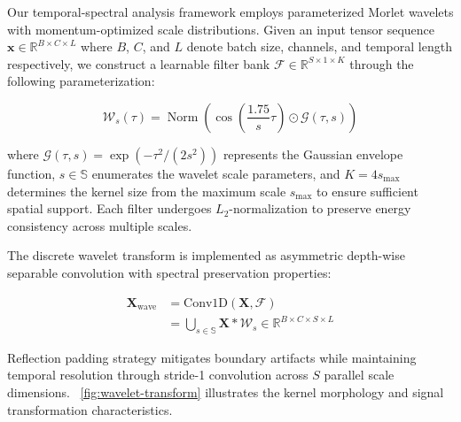 \documentclass[conference]{IEEEtran}
\begin{document}
Our temporal-spectral analysis framework employs parameterized Morlet wavelets with momentum-optimized scale distributions. Given an input tensor sequence $\mathbf{x} \in \mathbb{R}^{B \times C \times L}$ where $B$, $C$, and $L$ denote batch size, channels, and temporal length respectively, we construct a learnable filter bank $\mathcal{F} \in \mathbb{R}^{S \times 1 \times K}$ through the following parameterization:

\begin{equation}
    \mathcal{W}_s(\tau) = \operatorname{Norm} \left(\cos\left(\frac{1.75}{s}\tau\right) \odot \mathcal{G}(\tau,s)\right)
\end{equation}

where $\mathcal{G}(\tau,s) = \exp(-\tau^2/(2s^2))$ represents the Gaussian envelope function, $s \in \mathbb{S}$ enumerates the wavelet scale parameters, and $K=4s_{\text{max}}$ determines the kernel size from the maximum scale $s_{\text{max}}$ to ensure sufficient spatial support. Each filter undergoes $L_2$-normalization to preserve energy consistency across multiple scales.

The discrete wavelet transform is implemented as asymmetric depth-wise separable convolution with spectral preservation properties:

\begin{equation}
    \begin{aligned}
        \mathbf{X}_{\text{wave}} & = \text{Conv1D}(\mathbf{X}, \mathcal{F})                                                                 \\
                                 & = \bigcup_{s \in \mathbb{S}} \mathbf{X} \ast \mathcal{W}_s \in \mathbb{R}^{B \times C \times S \times L}
    \end{aligned}
\end{equation}

Reflection padding strategy mitigates boundary artifacts while maintaining temporal resolution through stride-1 convolution across $S$ parallel scale dimensions. \figurename~\ref{fig:wavelet-transform} illustrates the kernel morphology and signal transformation characteristics.
\end{document}
